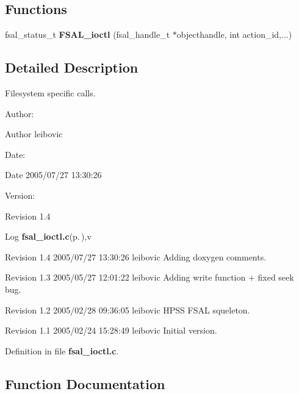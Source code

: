 \subsection*{Functions}
\begin{CompactItemize}
\item 
fsal\_\-status\_\-t {\bf FSAL\_\-ioctl} (fsal\_\-handle\_\-t $\ast$objecthandle, int action\_\-id,...)
\end{CompactItemize}


\subsection{Detailed Description}
Filesystem specific calls. 

\begin{Desc}
\item[Author:]\begin{Desc}
\item[Author]leibovic \end{Desc}
\end{Desc}
\begin{Desc}
\item[Date:]\begin{Desc}
\item[Date]2005/07/27 13:30:26 \end{Desc}
\end{Desc}
\begin{Desc}
\item[Version:]\begin{Desc}
\item[Revision]1.4 \end{Desc}
\end{Desc}
\begin{Desc}
\item[Log]{\bf fsal\_\-ioctl.c}{\rm (p.\,\pageref{fsal__ioctl_8c})},v \end{Desc}
Revision 1.4 2005/07/27 13:30:26 leibovic Adding doxygen comments.

Revision 1.3 2005/05/27 12:01:22 leibovic Adding write function + fixed seek bug.

Revision 1.2 2005/02/28 09:36:05 leibovic HPSS FSAL squeleton.

Revision 1.1 2005/02/24 15:28:49 leibovic Initial version.

Definition in file {\bf fsal\_\-ioctl.c}.

\subsection{Function Documentation}
